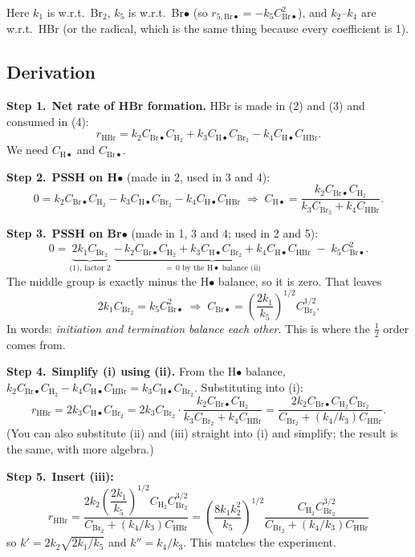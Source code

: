 \documentclass[11pt]{article}
\newcommand{\step}[1]{\par\smallskip\textcolor{stepgray}{\textbf{Step #1.}}\ }
\begin{document}
Here $k_1$ is w.r.t.\ Br$_2$, $k_5$ is w.r.t.\ Br$\bullet$ (so $r_{5,\mathrm{Br}\bullet}=-k_5C_{\mathrm{Br}\bullet}^2$), and $k_2$--$k_4$ are
w.r.t.\ HBr (or the radical, which is the same thing because every coefficient is 1).

\subsection{Derivation}
\step{1}\textbf{Net rate of HBr formation.} HBr is made in (2) and (3) and consumed in (4):
\[
r_{\mathrm{HBr}}=k_2C_{\mathrm{Br}\bullet}C_{\mathrm{H_2}}+k_3C_{\mathrm{H}\bullet}C_{\mathrm{Br_2}}-k_4C_{\mathrm{H}\bullet}C_{\mathrm{HBr}}. \tag{i}
\]
We need $C_{\mathrm{H}\bullet}$ and $C_{\mathrm{Br}\bullet}$.

\step{2}\textbf{PSSH on H$\bullet$} (made in 2, used in 3 and 4):
\[
0=k_2C_{\mathrm{Br}\bullet}C_{\mathrm{H_2}}-k_3C_{\mathrm{H}\bullet}C_{\mathrm{Br_2}}-k_4C_{\mathrm{H}\bullet}C_{\mathrm{HBr}}
\;\Rightarrow\;
C_{\mathrm{H}\bullet}=\frac{k_2C_{\mathrm{Br}\bullet}C_{\mathrm{H_2}}}{k_3C_{\mathrm{Br_2}}+k_4C_{\mathrm{HBr}}}. \tag{ii}
\]
\step{3}\textbf{PSSH on Br$\bullet$} (made in 1, 3 and 4; used in 2 and 5):
\[
0=\underbrace{2k_1C_{\mathrm{Br_2}}}_{\text{(1), factor 2}}
\;\underbrace{-\,k_2C_{\mathrm{Br}\bullet}C_{\mathrm{H_2}}+k_3C_{\mathrm{H}\bullet}C_{\mathrm{Br_2}}+k_4C_{\mathrm{H}\bullet}C_{\mathrm{HBr}}}_{=\,0\text{ by the H}\bullet\text{ balance (ii)}}
\;-\;k_5C_{\mathrm{Br}\bullet}^2 .
\]
The middle group is exactly minus the H$\bullet$ balance, so it is zero. That leaves
\[
2k_1C_{\mathrm{Br_2}}=k_5C_{\mathrm{Br}\bullet}^2\;\Rightarrow\;
C_{\mathrm{Br}\bullet}=\left(\frac{2k_1}{k_5}\right)^{1/2}C_{\mathrm{Br_2}}^{1/2}. \tag{iii}
\]
In words: \emph{initiation and termination balance each other}. This is where the $\tfrac12$ order comes from.

\step{4}\textbf{Simplify (i) using (ii).} From the H$\bullet$ balance, $k_2C_{\mathrm{Br}\bullet}C_{\mathrm{H_2}}-k_4C_{\mathrm{H}\bullet}C_{\mathrm{HBr}}=k_3C_{\mathrm{H}\bullet}C_{\mathrm{Br_2}}$.
Substituting into (i):
\[
r_{\mathrm{HBr}}=2k_3C_{\mathrm{H}\bullet}C_{\mathrm{Br_2}}
=2k_3C_{\mathrm{Br_2}}\cdot\frac{k_2C_{\mathrm{Br}\bullet}C_{\mathrm{H_2}}}{k_3C_{\mathrm{Br_2}}+k_4C_{\mathrm{HBr}}}
=\frac{2k_2C_{\mathrm{Br}\bullet}C_{\mathrm{H_2}}C_{\mathrm{Br_2}}}{C_{\mathrm{Br_2}}+(k_4/k_3)C_{\mathrm{HBr}}}.
\]
(You can also substitute (ii) and (iii) straight into (i) and simplify; the result is the same, with more algebra.)

\step{5}\textbf{Insert (iii):}
\[
\boxed{\,r_{\mathrm{HBr}}=\frac{2k_2\left(\dfrac{2k_1}{k_5}\right)^{1/2}C_{\mathrm{H_2}}C_{\mathrm{Br_2}}^{3/2}}{C_{\mathrm{Br_2}}+(k_4/k_3)C_{\mathrm{HBr}}}
=\left(\frac{8k_1k_2^2}{k_5}\right)^{1/2}\frac{C_{\mathrm{H_2}}C_{\mathrm{Br_2}}^{3/2}}{C_{\mathrm{Br_2}}+(k_4/k_3)C_{\mathrm{HBr}}}\,}
\]
so $k'=2k_2\sqrt{2k_1/k_5}$ and $k''=k_4/k_3$. This matches the experiment. \checkmark
\end{document}
